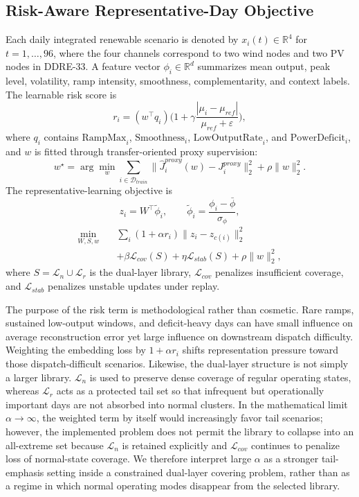 \documentclass[journal]{IEEEtran}
\begin{document}
\subsection{Risk-Aware Representative-Day Objective}
Each daily integrated renewable scenario is denoted by $x_i(t)\in\mathbb{R}^{4}$ for $t=1,\dots,96$, where the four channels correspond to two wind nodes and two PV nodes in DDRE-33. A feature vector $\phi_i\in\mathbb{R}^d$ summarizes mean output, peak level, volatility, ramp intensity, smoothness, complementarity, and context labels. The learnable risk score is
\begin{equation}
r_i=(w^\top q_i)\Big(1+\gamma\frac{|\mu_i-\mu_{ref}|}{\mu_{ref}+\varepsilon}\Big),
\end{equation}
where $q_i$ contains $\mathrm{RampMax}_i$, $\mathrm{Smoothness}_i$, $\mathrm{LowOutputRate}_i$, and $\mathrm{PowerDeficit}_i$, and $w$ is fitted through transfer-oriented proxy supervision:
\begin{equation}
w^\star=\arg\min_w \sum_{i\in\mathcal{D}_{train}} \|\hat{J}^{proxy}_i(w)-J^{proxy}_i\|_2^2+\rho\|w\|_2^2.
\end{equation}
The representative-learning objective is
\begin{equation}
z_i=W^\top \tilde{\phi}_i,\qquad \tilde{\phi}_i=\frac{\phi_i-\bar{\phi}}{\sigma_\phi},
\end{equation}
\begin{equation}
\begin{aligned}
\min_{W,S,w}\quad & \sum_i (1+\alpha r_i)\|z_i-z_{c(i)}\|_2^2 \\
& +\beta \mathcal{L}_{cov}(S)+\eta \mathcal{L}_{stab}(S)+\rho\|w\|_2^2,
\end{aligned}
\end{equation}
where $S=\mathcal{L}_n\cup\mathcal{L}_r$ is the dual-layer library, $\mathcal{L}_{cov}$ penalizes insufficient coverage, and $\mathcal{L}_{stab}$ penalizes unstable updates under replay.

The purpose of the risk term is methodological rather than cosmetic. Rare ramps, sustained low-output windows, and deficit-heavy days can have small influence on average reconstruction error yet large influence on downstream dispatch difficulty. Weighting the embedding loss by $1+\alpha r_i$ shifts representation pressure toward those dispatch-difficult scenarios. Likewise, the dual-layer structure is not simply a larger library. $\mathcal{L}_n$ is used to preserve dense coverage of regular operating states, whereas $\mathcal{L}_r$ acts as a protected tail set so that infrequent but operationally important days are not absorbed into normal clusters. In the mathematical limit $\alpha\to\infty$, the weighted term by itself would increasingly favor tail scenarios; however, the implemented problem does not permit the library to collapse into an all-extreme set because $\mathcal{L}_n$ is retained explicitly and $\mathcal{L}_{cov}$ continues to penalize loss of normal-state coverage. We therefore interpret large $\alpha$ as a stronger tail-emphasis setting inside a constrained dual-layer covering problem, rather than as a regime in which normal operating modes disappear from the selected library.
\end{document}
